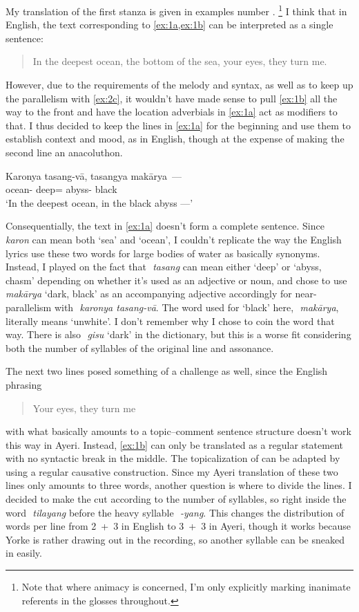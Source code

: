 \documentclass[12pt,paper=a4]{scrartcl}
\newcommand{\zwsp}{\mbox{​}} %
\newcommand{\rayr}[2]{\zwsp\smash{{\Tagati #1}} \emph{#2}} %
\newcommand{\xayr}[3]{\zwsp\smash{\Tagati #1} \emph{#2} `#3'} %
\begin{document}
My translation of the first stanza is given in examples number
.%
%
	\footnote{Note that where animacy is concerned, I'm only explicitly marking
	inanimate referents in the glosses throughout.}
%
I think that in English, the text corresponding to \cref{ex:1a,ex:1b} can be
interpreted as a single sentence: \blockquote{In the deepest ocean, the bottom
of the sea, your eyes, they turn me.} However, due to the requirements of the
melody and syntax, as well as to keep up the parallelism with \cref{ex:2c}, it
wouldn't have made sense to pull \cref{ex:1b} all the way to the front and have
the location adverbials in \cref{ex:1a} act as modifiers to that. I thus
decided to keep the lines in \cref{ex:1a} for the beginning and use them to
establish context and mood, as in English, though at the expense of making the
second line an anacoluthon.

\begin{exe}
\ex \label{ex:1a}
	\gll Karonya tasang-vā, tasangya makārya~--- \\
		ocean-\Loc{} deep=\Sup{} abyss-\Loc{} black \\
	\trans `In the deepest ocean, in the black abyss ---'
\end{exe}

Consequentially, the text in \cref{ex:1a} doesn't form a complete sentence.
Since \rayr{kronF}{karon} can mean both `sea' and `ocean', I couldn't replicate
the way the English lyrics use these two words for large bodies of water as
basically synonyms. Instead, I played on the fact that \rayr{tsNF}{tasang} can
mean either `deep' or `abyss, chasm' depending on whether it's used as an
adjective or noun, and chose to use \xayr{mkaarFy}{makārya}{dark, black} as an
accompanying adjective accordingly for near-parallelism with \rayr{kronY
tsNF/vaa}{karonya tasang-vā}. The word used for `black' here,
\rayr{mkaarFy}{makārya}, literally means `unwhite'. I don't remember why I
chose to coin the word that way. There is also \xayr{gisu}{gisu}{dark} in the
dictionary, but this is a worse fit considering both the number of syllables of
the original line and assonance.

The next two lines posed something of a challenge as well, since the English
phrasing \blockquote{Your eyes, they turn me} with what basically amounts to a
topic--comment sentence structure doesn't work this way in Ayeri. Instead,
\cref{ex:1b} can only be translated as a regular statement with no syntactic
break in the middle. The topicalization of  can be adapted by
using a regular causative construction. Since my Ayeri translation of these two
lines only amounts to three words, another question is where to divide the
lines. I decided to make the cut according to the number of syllables, so right
inside the word \rayr{tilyNF}{tilayang} before the heavy syllable
\rayr{/yNF}{-yang}. This changes the distribution of words per line from 2~+~3
in English to 3~+~3 in Ayeri, though it works because Yorke is rather drawing
out  in the recording, so another syllable can be sneaked
in easily.
\end{document}
